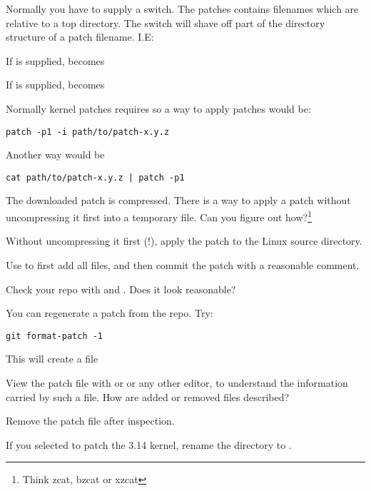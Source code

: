 Normally you have to supply a  switch. The patches contains filenames
which are relative to a top directory. The  switch will shave off
part of the directory structure of a patch filename. I.E:
 
If  is supplied,   becomes 

If  is supplied,   becomes  

Normally kernel patches requires  so a way to apply patches would be:

\begin{verbatim}
patch -p1 -i path/to/patch-x.y.z
\end{verbatim}

Another way would be

\begin{verbatim}
cat path/to/patch-x.y.z | patch -p1
\end{verbatim}

The downloaded patch is compressed. There is a way to apply a patch
without uncompressing it first into a temporary file.
Can you figure out how?\footnote{Think zcat, bzcat or xzcat}

Without uncompressing it first (!), apply the patch to the Linux source directory.

Use  to first add all files, and then commit the patch with a reasonable comment.

Check your repo with  and . Does it look reasonable?

You can regenerate a patch from the repo. Try:

\begin{verbatim}
git format-patch -1
\end{verbatim}

This will create a file 

View the patch file with  or  or any other editor,
to understand the information carried by such a file. 
How are added or removed files described?

Remove the patch file after inspection.

If you selected to patch the 3.14 kernel, rename the  directory to .

